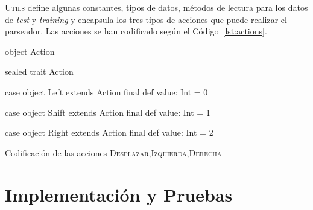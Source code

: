 \textsc{Utils} define algunas constantes, tipos de datos, métodos de lectura
para los datos de \emph{test} y \emph{training} y encapsula los tres tipos de
acciones que puede realizar el parseador. Las acciones se han codificado según
el Código~\ref{lst:actions}.
\begin{listing}[ht]
  \begin{scalacode}
    object Action {

      sealed trait Action

      case object Left extends Action {
        final def value: Int = 0
      }

      case object Shift extends Action {
        final def value: Int = 1
      }

      case object Right extends Action {
        final def value: Int = 2
      }
    }
  \end{scalacode}
  \caption{\footnotesize Codificación de las acciones \textsc{Desplazar,Izquierda,Derecha}}
  \label{lst:actions}
\end{listing}

\section{Implementación y Pruebas}
\label{sec:impl}



